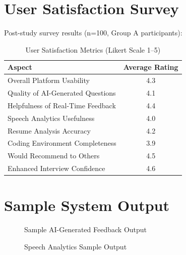 \documentclass[12pt,a4paper,oneside]{report}
\begin{document}
\section{User Satisfaction Survey}

Post-study survey results (n=100, Group A participants):

\begin{table}[H]
\centering
\caption{User Satisfaction Metrics (Likert Scale 1--5)}
\label{tab:satisfaction}
\begin{tabular}{|l|c|}
\hline
\textbf{Aspect} & \textbf{Average Rating} \\
\hline
Overall Platform Usability & 4.3 \\
\hline
Quality of AI-Generated Questions & 4.1 \\
\hline
Helpfulness of Real-Time Feedback & 4.4 \\
\hline
Speech Analytics Usefulness & 4.0 \\
\hline
Resume Analysis Accuracy & 4.2 \\
\hline
Coding Environment Completeness & 3.9 \\
\hline
Would Recommend to Others & 4.5 \\
\hline
Enhanced Interview Confidence & 4.6 \\
\hline
\end{tabular}
\end{table}


\section{Sample System Output}

\begin{figure}[H]
\centering
{}
\caption{Sample AI-Generated Feedback Output}
\label{fig:output_sample}
\end{figure}

\begin{figure}[H]
\centering
{}
\caption{Speech Analytics Sample Output}
\label{fig:speech_output}
\end{figure}
\end{document}
